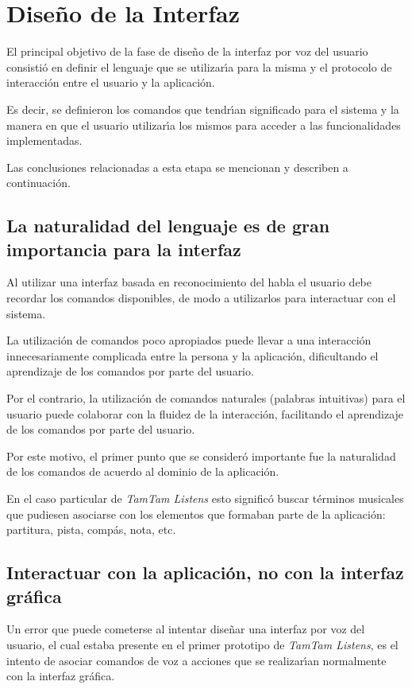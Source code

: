 \section{Dise\~no de la Interfaz}
\label{sec:disenho-interfaz}

El principal objetivo de la fase de dise\~no de la interfaz por voz del usuario consisti\'o
en definir el lenguaje que se utilizar{\'\i}a para la misma y el protocolo de interacci\'on entre
el usuario y la aplicaci\'on.

Es decir, se definieron los comandos que tendr{\'\i}an significado para el sistema y la manera
en que el usuario utilizar{\'\i}a los mismos para acceder a las funcionalidades implementadas.

Las conclusiones relacionadas a esta etapa se mencionan y describen a continuaci\'on.

\subsection{La naturalidad del lenguaje es de gran importancia para la interfaz}
Al utilizar una interfaz basada en reconocimiento del habla el usuario debe recordar los
comandos disponibles, de modo a utilizarlos para interactuar con el sistema.

La utilizaci\'on de comandos poco apropiados puede llevar a una interacci\'on innecesariamente
complicada entre la persona y la aplicaci\'on, dificultando el aprendizaje
de los comandos por parte del usuario.

Por el contrario, la utilizaci\'on de comandos naturales (palabras intuitivas) para el usuario puede colaborar
con la fluidez de la interacci\'on, facilitando el aprendizaje de los comandos por parte del usuario. 

Por este motivo, el primer punto que se consider\'o importante fue la naturalidad de los comandos
de acuerdo al dominio de la aplicaci\'on.

En el caso particular de \emph{TamTam Listens} esto signific\'o buscar t\'erminos musicales
que pudiesen asociarse con los elementos que formaban parte de la aplicaci\'on: partitura,
pista, comp\'as, nota, etc.

\subsection{Interactuar con la aplicaci\'on, no con la interfaz gr\'afica}
Un error que puede cometerse al intentar dise\~nar una interfaz por voz del usuario,
el cual estaba presente en el primer prototipo de \emph{TamTam Listens}, es el intento
de asociar comandos de voz a acciones que se realizar{\'\i}an normalmente con la interfaz
gr\'afica.

